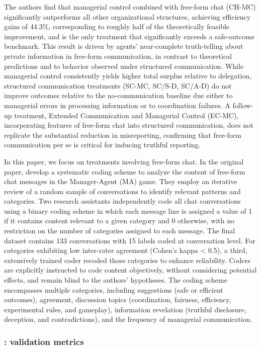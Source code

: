 \documentclass[11pt]{article}
\begin{document}
\begin{sloppypar}
The authors find that managerial control combined with free-form chat (CH-MC) significantly outperforms all other organizational structures, achieving efficiency gains of 44.3\%, corresponding to roughly half of the theoretically feasible improvement, and is the only treatment that significantly exceeds a safe-outcome benchmark. This result is driven by agents’ near-complete truth-telling about private information in free-form communication, in contrast to theoretical predictions and to behavior observed under structured communication. While managerial control consistently yields higher total surplus relative to delegation, structured communication treatments (SC-MC, SC/S-D, SC/A-D) do not improve outcomes relative to the no-communication baseline due either to managerial errors in processing information or to coordination failures. A follow-up treatment, Extended Communication and Managerial Control (EC-MC), incorporating features of free-form chat into structured communication, does not replicate the substantial reduction in misreporting, confirming that free-form communication per se is critical for inducing truthful reporting.

In this paper, we focus on treatments involving free-form chat. In the original paper, \citet{brandts_cooper_2025} develop a systematic coding scheme to analyze the content of free-form chat messages in the Manager-Agent (MA) game. They employ an iterative review of a random sample of conversations to identify relevant patterns and categories. Two research assistants independently code all chat conversations using a binary coding scheme in which each message line is assigned a value of 1 if it contains content relevant to a given category and 0 otherwise, with no restriction on the number of categories assigned to each message. The final dataset contains 133 conversations with 15 labels coded at conversation level. For categories exhibiting low inter-rater agreement (Cohen's kappa < 0.5), a third, extensively trained coder recoded those categories to enhance reliability. Coders are explicitly instructed to code content objectively, without considering potential effects, and remain blind to the authors' hypotheses. The coding scheme encompasses multiple categories, including suggestions (safe or efficient outcomes), agreement, discussion topics (coordination, fairness, efficiency, experimental rules, and gameplay), information revelation (truthful disclosure, deception, and contradictions), and the frequency of managerial communication. 

\subsubsection{\citet{brandts_cooper_2025}: validation metrics}


\end{sloppypar}
\end{document}
